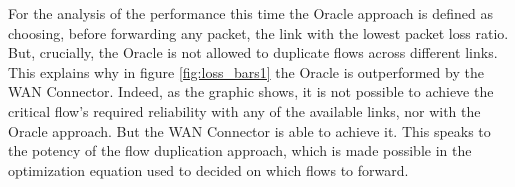 For the analysis of the performance this time the Oracle approach is defined as choosing, before forwarding any packet, the link with the lowest packet loss ratio. But, crucially, the Oracle is not allowed to duplicate flows across different links. This explains why in figure \ref{fig:loss_bars1} the Oracle is outperformed by the WAN Connector. Indeed, as the graphic shows, it is not possible to achieve the critical flow's required reliability with any of the available links, nor with the Oracle approach. But the WAN Connector is able to achieve it. This speaks to the potency of the flow duplication approach, which is made possible in the optimization equation used to decided on which flows to forward.
































